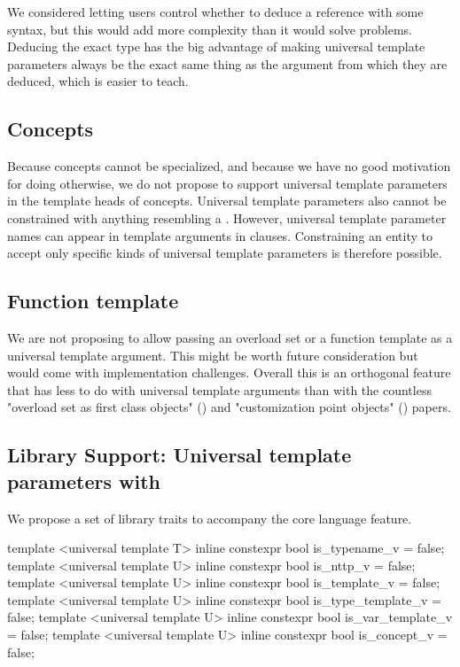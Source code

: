 \documentclass{wg21}
\begin{document}
We considered letting users control whether to deduce a reference with some syntax, but this would add more complexity than it would solve problems.
Deducing the exact type has the big advantage of making universal template parameters always be the exact same thing as the argument from which they are deduced,
which is easier to teach.

\subsection{Concepts}

Because concepts cannot be specialized, and because we have no good motivation for doing otherwise, we do not propose to support universal template parameters in the template heads of concepts.
Universal template parameters also cannot be constrained with anything resembling a .
However, universal template parameter names can appear in template arguments in  clauses.
Constraining an entity to accept only specific kinds of universal template parameters is therefore possible.


\subsection{Function template}


We are not proposing to allow passing an overload set or a function template as a universal template argument.
This might be worth future consideration but would come with implementation challenges.
Overall this is an orthogonal feature that has less to do with universal template arguments than with the countless
"overload set as first class objects" () and "customization point objects" () papers.


\subsection{Library Support: Universal template parameters with }

We propose a set of library traits to accompany the core language feature.


\begin{colorblock}
template <universal template T>
inline constexpr bool is_typename_v = false;
template <universal template U>
inline constexpr bool is_nttp_v = false;
template <universal template U>
inline constexpr bool is_template_v = false;
template <universal template U>
inline constexpr bool is_type_template_v = false;
template <universal template U>
inline constexpr bool is_var_template_v = false;
template <universal template U>
inline constexpr bool is_concept_v = false;
\end{colorblock}
\end{document}
